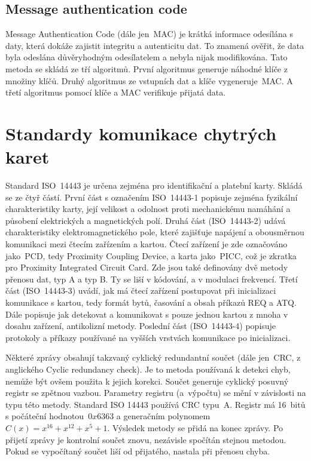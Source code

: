 \subsection{Message authentication code}
Message Authentication Code (dále jen~MAC) je krátká informace odesílána s daty, která dokáže zajistit integritu a autenticitu dat. To znamená ověřit, že data byla odeslána důvěryhodným odesílatelem a nebyla nijak modifikována. Tato metoda se skládá ze tří algoritmů. První algoritmus generuje náhodné klíče z množiny klíčů. Druhý algoritmus ze vstupních dat a klíče vygeneruje~MAC. A třetí algoritmus pomocí klíče a MAC verifikuje přijatá data\cite{Foundations_Of_Cryptography}.
\par

\section{Standardy komunikace chytrých karet}
Standard ISO~14443 je určena zejména pro identifikační a platební karty. Skládá se ze čtyř částí. První část s označením {ISO~14443-1} popisuje zejména fyzikální charakteristiky karty, její velikost a odolnost proti mechanickému namáhání a působení elektrických a magnetických polí. Druhá část ({ISO~14443-2}) udává charakteristiky elektromagnetického pole, které zajišťuje napájení a obousměrnou komunikaci mezi čtecím zařízením a kartou. Čtecí zařízení je zde označováno jako~PCD, tedy Proximity Coupling Device, a karta jako~PICC, což je zkratka pro Proximity Integrated Circuit Card. Zde jsou také definovány dvě metody přenosu dat, typ A a typ B. Ty se liší v kódování, a v modulaci frekvencí. Třetí část ({ISO~14443-3}) uvádí, jak má čtecí zařízení postupovat při inicializaci komunikace s kartou, tedy formát bytů, časování a obsah příkazů REQ a ATQ. Dále popisuje jak detekovat a komunikovat s pouze jednou kartou z mnoha v dosahu zařízení, antikolizní metody. Poslední část ({ISO~14443-4})  popisuje protokoly a příkazy používané na vyšších vrstvách komunikace po inicializaci\cite{ISO14443}.
\par
Některé zprávy obsahují takzvaný cyklický redundantní součet (dále jen~CRC, z anglického Cyclic redundancy check). Je to metoda používaná k detekci chyb, nemůže být ovšem použita k jejich korekci. Součet generuje cyklický posuvný registr se zpětnou vazbou. Parametry registru (a~výpočtu) se mění v závislosti na typu této metody. Standard ISO 14443 používá CRC typu~A. Registr má 16~bitů s počáteční hodnotou~$0x6363$ a generačním polynomem $C(x) = x^{16} + x^{12} + x^5 + 1$. Výsledek metody se přidá na konec zprávy. Po přijetí zprávy je kontrolní součet znovu, nezávisle spočítán stejnou metodou. Pokud se vypočítaný součet liší od přijatého, nastala při přenosu chyba\cite{Smart_card_handbook}\cite{ISO14443}.


